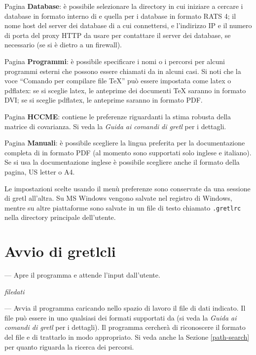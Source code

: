 Pagina \textbf{Database}: è possibile selezionare la directory in cui
iniziare a cercare i database in formato interno di  e
quella per i database in formato RATS 4; il nome host del server dei
database di  a cui connettersi, e l'indirizzo IP e il
numero di porta del proxy HTTP da usare per contattare il server dei
database, se necessario (se si è dietro a un firewall).
      
Pagina \textbf{Programmi}: è possibile specificare i nomi o i percorsi
per alcuni programmi esterni che possono essere chiamati da
 in alcuni casi. Si noti che la voce ``Comando per
compilare file {\TeX}'' può essere impostata come latex o pdflatex: se
si sceglie latex, le anteprime dei documenti {\TeX} saranno in formato
DVI; se si sceglie pdflatex, le anteprime saranno in formato PDF.
      
Pagina \textbf{HCCME}: contiene le preferenze riguardanti la stima
robusta della matrice di covarianza. Si veda la \emph{Guida ai comandi
  di gretl} per i dettagli.
      
Pagina \textbf{Manuali}: è possibile scegliere la lingua preferita per
la documentazione completa di  in formato PDF (al momento
sono supportati solo inglese e italiano). Se si usa la documentazione
inglese è possibile scegliere anche il formato della pagina, US letter
o A4.
      
Le impostazioni scelte usando il menù preferenze sono conservate da
una sessione di gretl all'altra. Su MS Windows vengono salvate nel
registro di Windows, mentre su altre piattaforme sono salvate in un
file di testo chiamato \texttt{.gretlrc} nella directory principale
dell'utente.


\section{Avvio di gretlcli}
\label{optarg2}


--- Apre il programma e attende l'input dall'utente.
      
 \textsl{filedati}

--- Avvia il programma caricando nello spazio di lavoro il file di
dati indicato. Il file può essere in uno qualsiasi dei formati
supportati da  (si veda la \emph{Guida ai comandi di gretl}
per i dettagli). Il programma cercherà di riconoscere il formato del
file e di trattarlo in modo appropriato. Si veda anche la Sezione
\ref{path-search} per quanto riguarda la ricerca dei percorsi.

